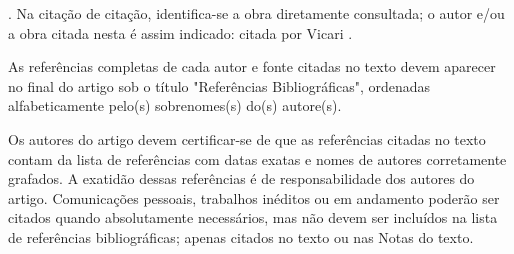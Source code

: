 \documentclass[a4paper]{article}
\begin{document}
. Na citação de citação, identifica-se a obra diretamente consultada; o autor e/ou a obra citada nesta é assim indicado: \cite{knuth:84} citada por Vicari \cite{teste}.

As referências completas de cada autor e fonte citadas no texto devem aparecer no final do artigo sob o título "Referências Bibliográficas", ordenadas alfabeticamente pelo(s) sobrenomes(s) do(s) autore(s).

Os autores do artigo devem certificar-se de que as referências citadas no texto contam da lista de referências com datas exatas e nomes de autores corretamente grafados. A exatidão dessas referências é de responsabilidade dos autores do artigo. Comunicações pessoais, trabalhos inéditos ou em andamento poderão ser citados quando absolutamente necessários, mas não devem ser incluídos na lista de referências bibliográficas; apenas citados no texto ou nas Notas do texto.



\end{document}
